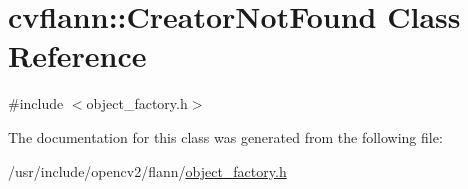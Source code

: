 \hypertarget{classcvflann_1_1CreatorNotFound}{\section{cvflann\-:\-:Creator\-Not\-Found Class Reference}
\label{classcvflann_1_1CreatorNotFound}
}


{\ttfamily \#include $<$object\-\_\-factory.\-h$>$}



The documentation for this class was generated from the following file\-:\begin{DoxyCompactItemize}
\item 
/usr/include/opencv2/flann/\hyperlink{object__factory_8h}{object\-\_\-factory.\-h}\end{DoxyCompactItemize}
